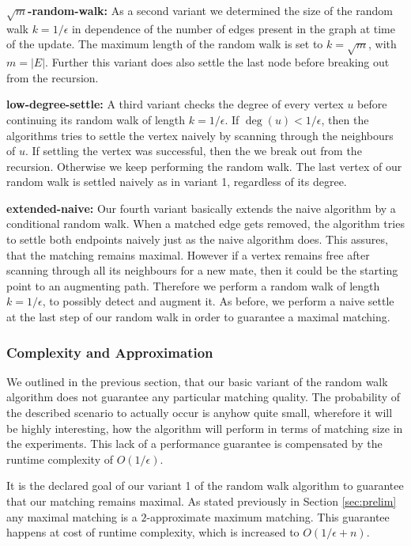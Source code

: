 \documentclass{article}      %
\begin{document}
\bigskip
\noindent
\textbf{$\sqrt{m}$-random-walk:} As a second variant we determined the size of the random walk $k=1/\epsilon$ in dependence of the number of edges present in the graph at time of the update. The maximum length of the random walk is set to $k=\sqrt{m}$, with $m = |E|$. Further this variant does also settle the last node before breaking out from the recursion.

\bigskip
\noindent
\textbf{low-degree-settle:} A third variant checks the degree of every vertex $u$ before continuing its random walk of length $k=1/\epsilon$. If $\deg(u)<1/\epsilon$, then the algorithms tries to settle the vertex naively by scanning through the neighbours of $u$. If settling the vertex was successful, then the we break out from the recursion. Otherwise we keep performing the random walk. The last vertex of our random walk is settled naively as in variant 1, regardless of its degree. 

\bigskip
\noindent
\textbf{extended-naive:} Our fourth variant basically extends the naive algorithm by a conditional random walk. When a matched edge gets removed, the algorithm tries to settle both endpoints naively just as the naive algorithm does. This assures, that the matching remains maximal. However if a vertex remains free after scanning through all its neighbours for a new mate, then it could be the starting point to an augmenting path. Therefore we perform a random walk of length $k = 1/\epsilon$, to possibly detect and augment it. As before, we perform a naive settle at the last step of our random walk in order to guarantee a maximal matching.

\subsubsection{Complexity and Approximation}
\label{sec:rw-complx-approx}

We outlined in the previous section, that our basic variant of the random walk algorithm does not guarantee any particular matching quality. The probability of the described scenario to actually occur is anyhow quite small, wherefore it will be highly interesting, how the algorithm will perform in terms of matching size in the experiments. This lack of a performance guarantee is compensated by the runtime complexity of $O(1/\epsilon)$.

It is the declared goal of our variant 1 of the random walk algorithm to guarantee that our matching remains maximal. As stated previously in Section \ref{sec:prelim} any maximal matching is a $2$-approximate maximum matching. This guarantee happens at cost of runtime complexity, which is increased to $O(1/\epsilon + n)$.
\end{document}
